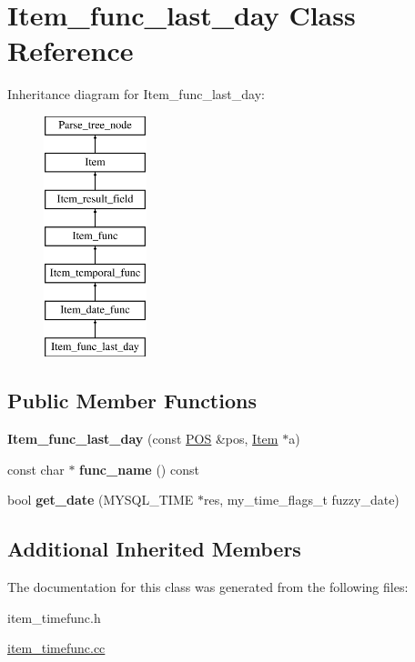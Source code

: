 \hypertarget{classItem__func__last__day}{}\section{Item\+\_\+func\+\_\+last\+\_\+day Class Reference}
\label{classItem__func__last__day}
Inheritance diagram for Item\+\_\+func\+\_\+last\+\_\+day\+:\begin{figure}[H]
\begin{center}
\leavevmode
\includegraphics[height=7.000000cm]{classItem__func__last__day}
\end{center}
\end{figure}
\subsection*{Public Member Functions}
\begin{DoxyCompactItemize}
\item 
\mbox{\label{classItem__func__last__day_a3baed3671ddc000943391a6e4e7d11b0}} 
{\bfseries Item\+\_\+func\+\_\+last\+\_\+day} (const \mbox{\hyperlink{structYYLTYPE}{P\+OS}} \&pos, \mbox{\hyperlink{classItem}{Item}} $\ast$a)
\item 
\mbox{\label{classItem__func__last__day_a17975921ef1d93c086b7e66f6e15731a}} 
const char $\ast$ {\bfseries func\+\_\+name} () const
\item 
\mbox{\label{classItem__func__last__day_a44a1ad9c6d6e8d2c288a267624210f34}} 
bool {\bfseries get\+\_\+date} (M\+Y\+S\+Q\+L\+\_\+\+T\+I\+ME $\ast$res, my\+\_\+time\+\_\+flags\+\_\+t fuzzy\+\_\+date)
\end{DoxyCompactItemize}
\subsection*{Additional Inherited Members}


The documentation for this class was generated from the following files\+:\begin{DoxyCompactItemize}
\item 
item\+\_\+timefunc.\+h\item 
\mbox{\hyperlink{item__timefunc_8cc}{item\+\_\+timefunc.\+cc}}\end{DoxyCompactItemize}
